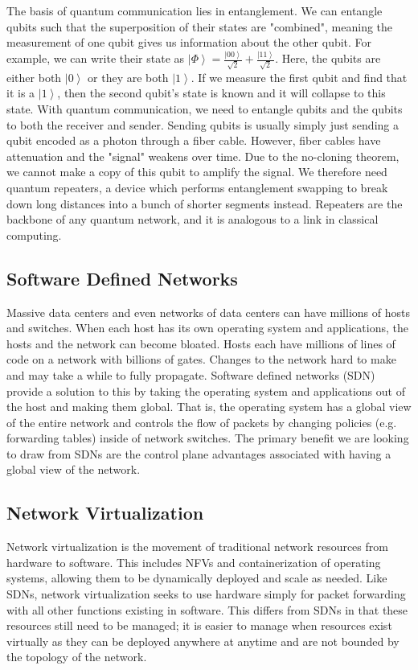 \documentclass[sigplan,screen]{acmart}
\begin{document}
The basis of quantum communication lies in entanglement.
We can entangle qubits such that the superposition of their states are "combined", meaning the measurement of one qubit gives us information about the other qubit.
For example, we can write their state as $\left| \Phi \right> = \frac{\left| 00 \right>}{\sqrt{2}} + \frac{\left| 11 \right>}{\sqrt{2}}$.
Here, the qubits are either both $\left| 0 \right>$ or they are both $\left| 1 \right>$.
If we measure the first qubit and find that it is a $\left| 1 \right>$, then the second qubit's state is known and it will collapse to this state.
With quantum communication, we need to entangle qubits and the qubits to both the receiver and sender.
Sending qubits is usually simply just sending a qubit encoded as a photon through a fiber cable.
However, fiber cables have attenuation and the "signal" weakens over time.
Due to the no-cloning theorem, we cannot make a copy of this qubit to amplify the signal.
We therefore need quantum repeaters, a device which performs entanglement swapping to break down long distances into a bunch of shorter segments instead.
Repeaters are the backbone of any quantum network, and it is analogous to a link in classical computing.


\subsection{Software Defined Networks}
Massive data centers and even networks of data centers can have millions of hosts and switches.
When each host has its own operating system and applications, the hosts and the network can become bloated.
Hosts each have millions of lines of code on a network with billions of gates.
Changes to the network hard to make and may take a while to fully propagate.
Software defined networks (SDN) \cite{sdn} provide a solution to this by taking the operating system and applications out of the host and making them global.
That is, the operating system has a global view of the entire network and controls the flow of packets by changing policies (e.g. forwarding tables) inside of network switches.
The primary benefit we are looking to draw from SDNs are the control plane advantages associated with having a global view of the network.


\subsection{Network Virtualization}
Network virtualization \cite{NV} is the movement of traditional network resources from hardware to software.
This includes NFVs and containerization of operating systems, allowing them to be dynamically deployed and scale as needed.
Like SDNs, network virtualization seeks to use hardware simply for packet forwarding with all other functions existing in software.
This differs from SDNs in that these resources still need to be managed; it is easier to manage when resources exist virtually as they can be deployed anywhere at anytime and are not bounded by the topology of the network.
\end{document}
